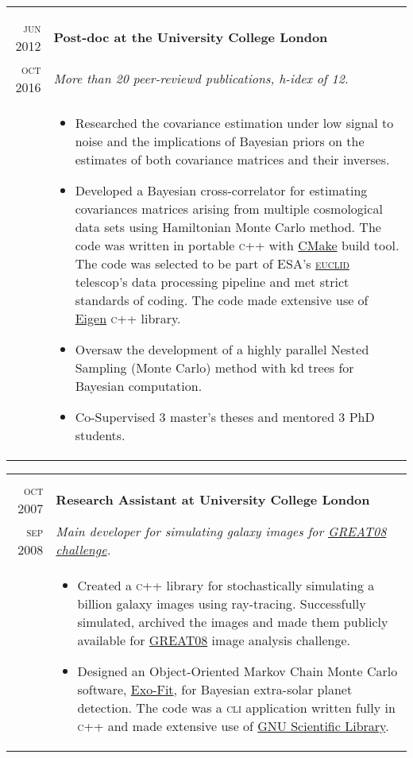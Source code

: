 \documentclass[a4paper,10pt]{article}
\begin{document}
\begin{tabular}{r|p{11cm}}
{\begin{itemize}
\end{itemize}
}\\
\multicolumn{2}{c}{} \\
\textsc{jun 2012} & \textbf{Post-doc at the University College London} \\
\textsc{oct 2016}	&\emph{More than 20 peer-reviewd publications, h-idex of 12.}\\
&\small{
\begin{itemize}
  \item Researched the covariance estimation under low signal to noise and the implications of Bayesian priors on the
  estimates of both covariance matrices and their inverses.
  \item Developed a Bayesian cross-correlator for estimating covariances matrices arising from multiple cosmological
  data sets using Hamiltonian Monte Carlo method. The code was written in portable \textsc{c++} with
  \href{https://cmake.org/}{CMake} build tool.
  The code was selected to be part of ESA's \href{https://www.euclid-ec.org/}{\textsc{euclid}} telescop's data processing   pipeline and met strict standards
  of coding. The code made extensive use of \href{http://eigen.tuxfamily.org/index.php?title=Main_Page}{Eigen} \textsc{c++} library.
  \item Oversaw the development of a highly parallel Nested Sampling (Monte Carlo) method with kd trees for
  Bayesian computation.
  \item Co-Supervised 3 master’s theses and mentored 3 PhD students.
\end{itemize}
}
\end{tabular}


\begin{tabular}{r|p{11cm}}
\multicolumn{2}{c}{} \\
\textsc{oct 2007} & \textbf{Research Assistant at University College London} \\
\textsc{sep 2008}	&\emph{Main developer for simulating galaxy images for \href{http://www.great08challenge.info/}{GREAT08 challenge}.}\\
& \small{
\begin{itemize}
  \item Created a \textsc{c++} library for stochastically simulating a billion galaxy images using ray-tracing.
  Successfully simulated, archived the images and made them publicly available for \href{http://www.great08challenge.info/}{GREAT08} image analysis challenge.
  \item Designed an Object-Oriented Markov Chain Monte Carlo software, \href{http://zuserver2.star.ucl.ac.uk/~lahav/exofit.html}{Exo-Fit}, for Bayesian extra-solar planet
  detection. The code was a \textsc{cli} application written fully in \textsc{c++} and made extensive use of
  \href{https://www.gnu.org/software/gsl/}{GNU Scientific Library}.
\end{itemize}
}
\end{tabular}
\end{document}
